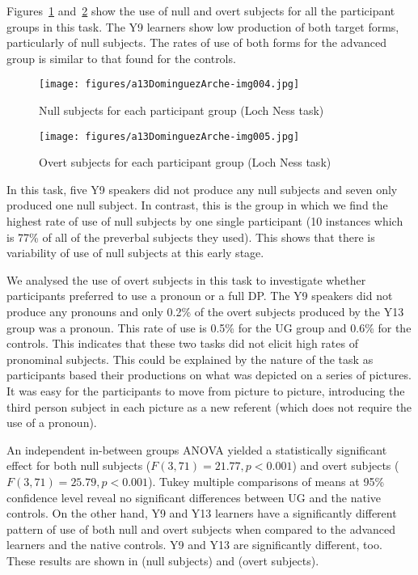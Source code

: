 \documentclass[output=paper]{langscibook}
\begin{document}
Figures~\ref{fig:dominguez:4} and~\ref{fig:dominguez:5} show the use of null and overt subjects for all the participant groups in this task. The Y9 learners show low production of both target forms, particularly of null subjects. The rates of use of both forms for the advanced group is similar to that found for the controls.

\begin{figure}[p]
\caption{Null subjects for each participant group (Loch Ness task)}
\label{fig:dominguez:4}
\texttt{[image: figures/a13DominguezArche-img004.jpg]}
\end{figure}


\begin{figure}[p]
\caption{Overt subjects for each participant group (Loch Ness task)}
\label{fig:dominguez:5}
\texttt{[image: figures/a13DominguezArche-img005.jpg]}
\end{figure}

In this task, five Y9 speakers did not produce any null subjects and seven only produced one null subject. In contrast, this is the group in which we find the highest rate of use of null subjects by one single participant (10 instances which is 77\% of all of the preverbal subjects they used). This shows that there is variability of use of null subjects at this early stage.\clearpage

We analysed the use of overt subjects in this task to investigate whether participants preferred to use a pronoun or a full DP. The Y9 speakers did not produce any pronouns and only 0.2\% of the overt subjects produced by the Y13 group was a pronoun. This rate of use is 0.5\% for the UG group and 0.6\% for the controls. This indicates that these two tasks did not elicit high rates of pronominal subjects. This could be explained by the nature of the task as participants based their productions on what was depicted on a series of pictures. It was easy for the participants to move from picture to picture, introducing the third person subject in each picture as a new referent (which does not require the use of a pronoun).

\begin{sloppypar}
An independent in-between groups ANOVA yielded a statistically significant effect for both null subjects ($F(3,71) = 21.77,\allowbreak p <0.001$) and overt subjects ($F(3,71) =25.79,\allowbreak p<0.001$). Tukey multiple comparisons of means at 95\% confidence level reveal no significant differences between UG and the native controls. On the other hand, Y9 and Y13 learners have a significantly different pattern of use of both null and overt subjects when compared to the advanced learners and the native controls. Y9 and Y13 are significantly different, too. These results are shown in  (null subjects) and  (overt subjects).
\end{sloppypar}\largerpage[2]
\end{document}

